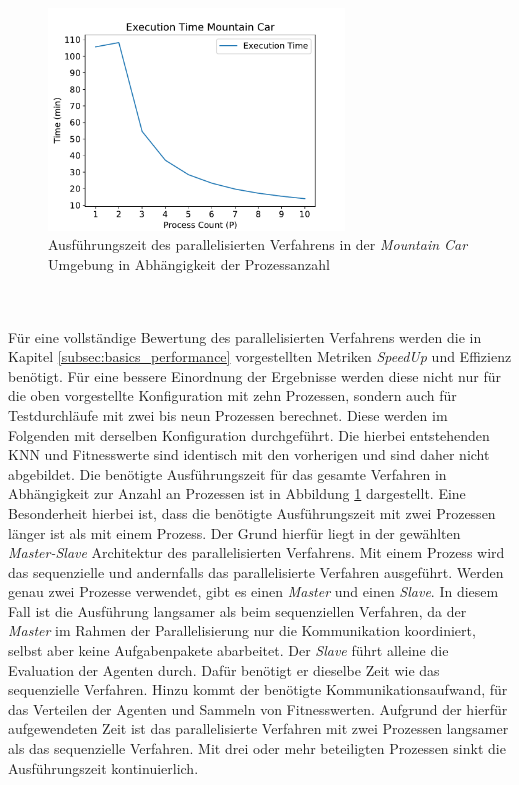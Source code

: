 \begin{figure}[!h]
	\centering
	\includegraphics[width=0.7\textwidth]{./img/mountain_car_analysis/time_mountain_car_1_10.pdf} 
	\caption{Ausführungszeit des parallelisierten Verfahrens in der \emph{Mountain Car} Umgebung in Abhängigkeit der Prozessanzahl}
	\label{fig:execution_time_mountain_car_1_10}
\end{figure}
\\\\
Für eine vollständige Bewertung des parallelisierten Verfahrens werden die in Kapitel \ref{subsec:basics_performance} vorgestellten Metriken \emph{SpeedUp} und Effizienz benötigt. Für eine bessere Einordnung der Ergebnisse werden diese nicht nur für die oben vorgestellte Konfiguration mit zehn Prozessen, sondern auch für Testdurchläufe mit zwei bis neun Prozessen berechnet. Diese werden im Folgenden mit derselben Konfiguration durchgeführt. Die hierbei entstehenden \ac{KNN} und Fitnesswerte sind identisch mit den vorherigen und sind daher nicht abgebildet. Die benötigte Ausführungszeit für das gesamte Verfahren in Abhängigkeit zur Anzahl an Prozessen ist in Abbildung \ref{fig:execution_time_mountain_car_1_10} dargestellt. Eine Besonderheit hierbei ist, dass die benötigte Ausführungszeit mit zwei Prozessen länger ist als mit einem Prozess. Der Grund hierfür liegt in der gewählten \emph{Master-Slave} Architektur des parallelisierten Verfahrens. Mit einem Prozess wird das sequenzielle und andernfalls das parallelisierte Verfahren ausgeführt. Werden genau zwei Prozesse verwendet, gibt es einen \emph{Master} und einen \emph{Slave}. In diesem Fall ist die Ausführung langsamer als beim sequenziellen Verfahren, da der \emph{Master} im Rahmen der Parallelisierung nur die Kommunikation koordiniert, selbst aber keine Aufgabenpakete abarbeitet. Der \emph{Slave} führt alleine die Evaluation der Agenten durch. Dafür benötigt er dieselbe Zeit wie das sequenzielle Verfahren. Hinzu kommt der benötigte Kommunikationsaufwand, für das Verteilen der Agenten und Sammeln von Fitnesswerten. Aufgrund der hierfür aufgewendeten Zeit ist das parallelisierte Verfahren mit zwei Prozessen langsamer als das sequenzielle Verfahren. Mit drei oder mehr beteiligten Prozessen sinkt die Ausführungszeit kontinuierlich. 
